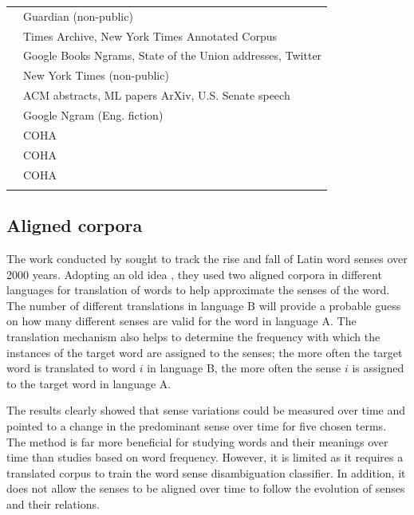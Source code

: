 \documentclass[output=paper]{langsci/langscibook}
\begin{document}
\begin{table}
\begin{tabularx}{\textwidth}{lQ}
\citet{kahmannnh17} & Guardian (non-public) \\
\citet{tahmasebi-ranlp17} & Times Archive, New York Times Annotated Corpus\\
\citet{bamler17} & Google Books Ngrams, State of the Union addresses, Twitter \\
\citet{yao2018dynamic} & New York Times (non-public)\\
\citet{rudolphb18-dynamicembforlangevo} & ACM abstracts, ML papers ArXiv, U.S. Senate speech\\
\citet{rosenfeld-erk-2018-deep} & Google Ngram (Eng. fiction)\\
\citet{hu-etal-2019-diachronic}& COHA\\
\citet{dubossarsky-etal-2019-time} & COHA\\
\citet{giulianelli-etal-2020-analysing} & COHA\\
\lspbottomrule
\end{tabularx}
\end{table}     

\subsection{Aligned corpora}\label{subs:alignedcorp}

The work conducted by \citet{bamman2011} sought to track the rise and fall of Latin word senses over 2000 years. Adopting an old idea \citep{dagan-etal-1991,dagan-itai-1994}, they used 
two aligned corpora in different languages for translation of words to help approximate the senses of the word. 
The number of different translations in language B will provide a probable guess on how many different senses are valid for the word in language A. The translation mechanism also helps to determine the frequency with which the instances of the target word are assigned to the senses; the more often the target word is translated to word $i$ in language B, the more often the sense $i$ is assigned to the target word in language A. 

The results clearly showed that sense variations could be measured over time and pointed to a change in the predominant sense over time for five chosen terms. 
%
The method is far more beneficial for studying words and their meanings over time than studies based on word frequency.
However, it is limited as it requires a translated corpus to train the word sense disambiguation classifier. In addition, it does not allow the senses to be aligned over time to follow the evolution of senses and their relations. 
   
\end{document}
